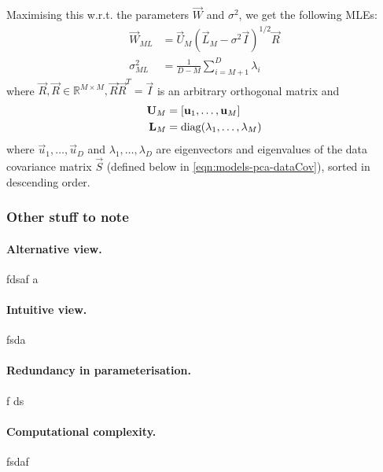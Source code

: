 Maximising this w.r.t. the parameters $\vec W$ and $\sigma^2$, we get the following MLEs:
\begin{align*}
    \vec W_{ML}     &= \vec U_M \left(\vec L_M - \sigma^2 \vec I \right)^{1 / 2} \vec R \\
    \sigma^2_{ML}   &= \frac{1}{D - M} \sum_{i = M + 1}^D \lambda_i
\end{align*}
where $\vec R, \vec R \in \mathbb R^{M \times M}, \vec R \vec R^T = \vec I$ is an arbitrary orthogonal matrix and
\begin{align*}
    \boldsymbol{\mathbf{U}}_M    &= \left[\boldsymbol{\mathbf{u}}_1, \dotsc, \boldsymbol{\mathbf{u}}_M \right] \\
    \boldsymbol{\mathbf{L}}_M    &= \operatorname{diag}(\lambda_1, \dotsc, \lambda_M)
\end{align*}
where $\vec u_1, \dotsc, \vec u_D$ and $\lambda_1, \dotsc, \lambda_D$ are eigenvectors and eigenvalues of the data covariance matrix $\vec S$ (defined below in \eqref{eqn:models-pca-dataCov}), sorted in descending order.

\subsubsection{Other stuff to note}
\paragraph{Alternative view.} fdsaf a
\paragraph{Intuitive view.} fsda 
\paragraph{Redundancy in parameterisation.} f ds
\paragraph{Computational complexity.}  fsdaf 


